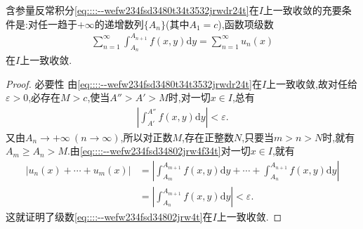 \documentclass[../../main.tex]{subfiles}%
\begin{document}
\begin{theorem}\label{theorem:数学分析--定理19.9}
含参量反常积分\eqref{eq::::--wefw234fsd3480t34t3532jrwdr24t}在$I$上一致收敛的充要条件是:对任一趋于$+\infty$的递增数列$\{A_n\}$(其中$A_1 = c$),函数项级数
\begin{align}
\sum_{n=1}^{\infty} \int_{A_n}^{A_{n+1}} f(x,y)\mathrm{d}y = \sum_{n=1}^{\infty} u_n(x) \label{eq::::--wefw234fsd34802jrw4t}
\end{align}
在$I$上一致收敛.
\end{theorem}
\begin{proof}

{\heiti 必要性} 由\eqref{eq::::--wefw234fsd3480t34t3532jrwdr24t}在$I$上一致收敛,故对任给$\varepsilon > 0$,必存在$M > c$,使当$A'' > A' > M$时,对一切$x \in I$,总有
\begin{align}
\left| \int_{A'}^{A''} f(x,y)\mathrm{d}y \right| < \varepsilon. \label{eq::::--wefw234fsd34802jrw4f34t}
\end{align}
又由$A_n \to +\infty\ (n \to \infty)$,所以对正数$M$,存在正整数$N$,只要当$m > n > N$时,就有$A_m \geqslant A_n > M$.由\eqref{eq::::--wefw234fsd34802jrw4f34t}对一切$x \in I$,就有
\begin{align*}
|u_n(x) + \cdots + u_m(x)| &= \left| \int_{A_m}^{A_{m+1}} f(x,y)\mathrm{d}y + \cdots + \int_{A_n}^{A_{n+1}} f(x,y)\mathrm{d}y \right| \\
&= \left| \int_{A_n}^{A_{m+1}} f(x,y)\mathrm{d}y \right| < \varepsilon.
\end{align*}
这就证明了级数\eqref{eq::::--wefw234fsd34802jrw4t}在$I$上一致收敛.


\end{proof}
\end{document}
